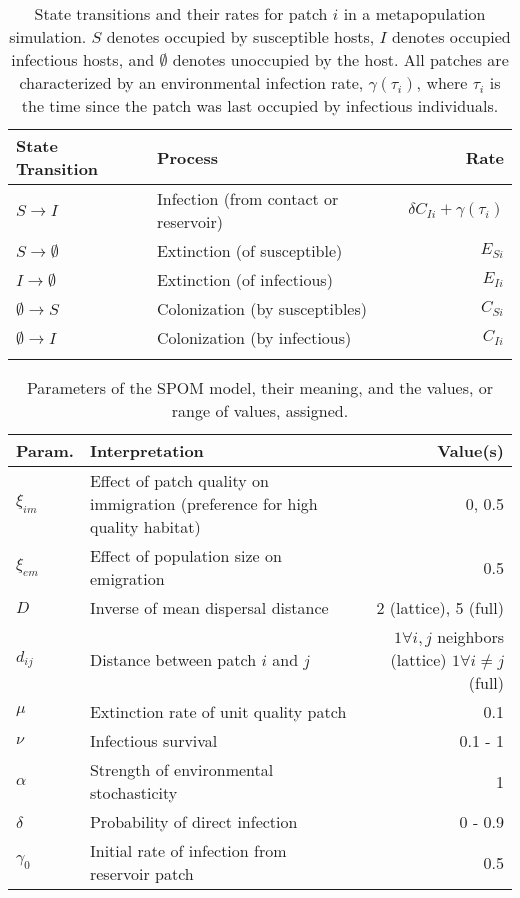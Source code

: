 \documentclass{article}
\begin{document}
\begin{table}
\caption{State transitions and their rates for patch $i$ in a metapopulation simulation.  $S$ denotes occupied by  susceptible hosts, $I$ denotes occupied infectious hosts, and $\emptyset$ denotes unoccupied by the host.  All patches are characterized by an environmental infection rate, $\gamma(\tau_i)$, where $\tau_i$ is the time since the patch was last occupied by infectious individuals.}
\begin{tabular}{llr}
State Transition & Process &  Rate \\
\hline
$S \rightarrow I$ & Infection (from contact or reservoir) & $\delta C_{Ii} + \gamma(\tau_i)$\\
$S \rightarrow \emptyset $ & Extinction (of susceptible) & $E_{Si}$\\
$I \rightarrow \emptyset $ & Extinction (of infectious) &  $E_{Ii}$ \\
$\emptyset \rightarrow S$ & Colonization (by susceptibles) & $C_{Si}$\\
$\emptyset \rightarrow I$ & Colonization (by infectious) & $C_{Ii}$\\
\label{transitions}
\end{tabular}
\end{table}

\begin{table}[h!]   
\caption{Parameters of the SPOM model, their meaning, and the values, or range of values, assigned.}
\begin{tabular}{p{1cm} p{6cm} r}
Param. & Interpretation &  Value(s) \\
\hline
$\xi_{im}$ & Effect of patch quality on immigration (preference for high quality habitat) & 0, 0.5 \\
$\xi_{em}$ & Effect of population size on emigration & 0.5  \\
$D$& Inverse of mean dispersal distance & 2 (lattice), 5 (full) \\
$d_{ij}$ & Distance between patch $i$ and $j$ & \parbox[t]{4cm}{\raggedleft $1 \forall i, j$ neighbors (lattice)\\ $1 \forall  i\neq j$ (full)}\\
\hline
$\mu$ & Extinction rate of unit quality patch & 0.1 \\
$\nu$ & Infectious survival & 0.1 - 1 \\
$\alpha$ & Strength of environmental stochasticity & 1 \\
\hline
$\delta$ & Probability of direct infection & 0 - 0.9 \\
$\gamma_0$ & Initial rate of infection from reservoir patch & 0.5
\end{tabular}
\label{params}
\end{table}
\end{document}
